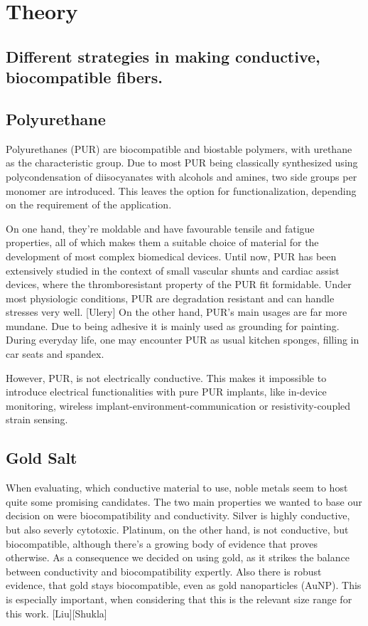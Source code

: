 \section{Theory}

\subsection{Different strategies in making conductive, biocompatible fibers.}



\subsection{Polyurethane}

Polyurethanes (PUR) are biocompatible and biostable polymers, with urethane as the characteristic group. Due to most PUR being classically synthesized using polycondensation of diisocyanates with alcohols and amines, two side groups per monomer are introduced. This leaves the option for functionalization, depending on the requirement of the application. 

On one hand, they're moldable and have favourable tensile and fatigue properties, all of which makes them a suitable choice of material for the development of most complex biomedical devices. Until now, PUR has been extensively studied in the context of small vascular shunts and cardiac assist devices, where the thromboresistant property of the PUR fit formidable. Under most physiologic conditions, PUR are degradation resistant and can handle stresses very well. [Ulery] 
On the other hand, PUR's main usages are far more mundane. Due to being adhesive it is mainly used as grounding for painting. During everyday life, one may encounter PUR as usual kitchen sponges, filling in car seats and spandex.

However, PUR, is not electrically conductive. This makes it impossible to introduce electrical functionalities with pure PUR implants, like in-device monitoring, wireless implant-environment-communication or resistivity-coupled strain sensing.



\subsection{Gold Salt}

When evaluating, which conductive material to use, noble metals seem to host quite some promising candidates. The two main properties we wanted to base our decision on were biocompatibility and conductivity. Silver is highly conductive, but also severly cytotoxic. Platinum, on the other hand, is not conductive, but biocompatible, although there's a growing body of evidence that proves otherwise. As a consequence we decided on using gold, as it strikes the balance between conductivity and biocompatibility expertly. Also there is robust evidence, that gold stays biocompatible, even as gold nanoparticles (AuNP). This is especially important, when considering that this is the relevant size range for this work. [Liu][Shukla]

